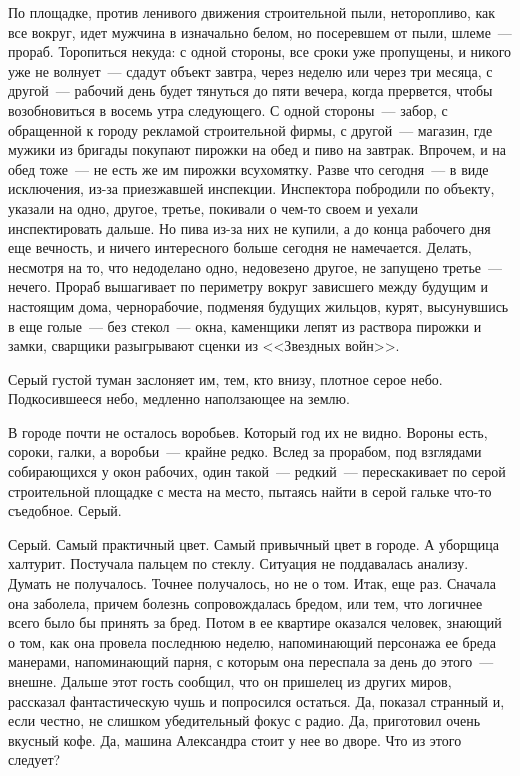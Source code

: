По площадке, против ленивого движения строительной пыли, неторопливо, как все 
вокруг, идет мужчина в изначально белом, но посеревшем от пыли, шлеме~--- 
прораб. 
Торопиться некуда: с одной стороны, все сроки уже пропущены, и никого уже не 
волнует~--- сдадут объект завтра, через неделю или через три месяца, с 
другой~--- рабочий день будет тянуться до пяти вечера, когда прервется, чтобы 
возобновиться 
в восемь утра следующего. С одной стороны~--- забор, с обращенной к городу 
рекламой строительной фирмы, с другой~--- магазин, где мужики из бригады 
покупают 
пирожки на обед и пиво на завтрак. Впрочем, и на обед тоже~--- не есть же им 
пирожки всухомятку. Разве что сегодня~--- в виде исключения, из-за приезжавшей 
инспекции. Инспектора побродили по объекту, указали на одно, другое, третье, 
покивали о чем-то своем и уехали инспектировать дальше.  Но пива из-за них не 
купили, а до конца рабочего дня еще вечность, и ничего интересного больше 
сегодня не намечается. Делать, несмотря на то, что недоделано одно, недовезено 
другое, не запущено третье~--- нечего. Прораб вышагивает по периметру вокруг 
зависшего между будущим и настоящим дома, чернорабочие, подменяя будущих 
жильцов, курят, высунувшись в еще голые~--- без стекол~--- окна, каменщики 
лепят из раствора пирожки и замки, сварщики разыгрывают сценки из <<Звездных 
войн>>. 

Серый густой туман заслоняет им, тем, кто внизу, плотное серое небо. 
Подкосившееся небо, медленно наползающее на землю.

В городе почти не осталось воробьев. Который год их не видно. Вороны есть, 
сороки, галки, а воробьи~--- крайне редко. Вслед за прорабом, под взглядами 
собирающихся у окон рабочих, один такой~--- редкий~--- перескакивает по серой 
строительной площадке с места на место, пытаясь найти в серой гальке что-то 
съедобное. Серый.

Серый. Самый практичный цвет. Самый привычный цвет в городе. А уборщица 
халтурит. Постучала пальцем по стеклу. Ситуация не поддавалась анализу. Думать 
не получалось. Точнее получалось, но не о том. Итак, еще раз. Сначала она 
заболела, причем болезнь сопровождалась бредом, или тем, что логичнее всего 
было 
бы принять за бред. Потом в ее квартире оказался человек, знающий о том, как 
она 
провела последнюю неделю, напоминающий персонажа ее бреда манерами, 
напоминающий 
парня, с которым она переспала за день до этого~--- внешне. Дальше этот гость 
сообщил, что он пришелец из других миров, рассказал фантастическую чушь и 
попросился остаться. Да, показал странный и, если честно, не слишком 
убедительный фокус с радио. Да, приготовил очень вкусный кофе. Да, машина 
Александра стоит у нее во дворе. Что из этого следует?

